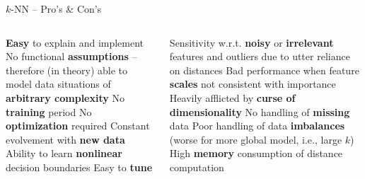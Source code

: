 
\begin{frame}{$k$-NN -- Pro's \& Con's}

\footnotesize

\begin{columns}[onlytextwidth]
  \begin{column}{0.5\textwidth}
    \footnotesize
    \begin{itemize}
      \positem \textbf{Easy} to explain and implement
      \positem No functional \textbf{assumptions} -- therefore (in theory) able 
      to model data situations of \textbf{arbitrary complexity}
      \positem No \textbf{training} period
      \positem No \textbf{optimization} required 
      \positem Constant evolvement with \textbf{new data}
      \positem Ability to learn \textbf{nonlinear} decision boundaries
      \positem Easy to \textbf{tune}
    \end{itemize}
  \end{column}
  \begin{column}{0.5\textwidth}
    \footnotesize
    \begin{itemize}
      \negitem Sensitivity w.r.t. \textbf{noisy} or \textbf{irrelevant} features
      and outliers due to utter reliance on distances
      \negitem Bad performance when feature \textbf{scales} not consistent 
      with importance
      \negitem Heavily afflicted by \textbf{curse of dimensionality}
      \negitem No handling of \textbf{missing} data
      \negitem Poor handling of data \textbf{imbalances} (worse for more global 
      model, i.e., large $k$)
      \negitem High \textbf{memory} consumption of distance computation
    \end{itemize}
  \end{column}
\end{columns}

\vfill

\small


\end{frame}


